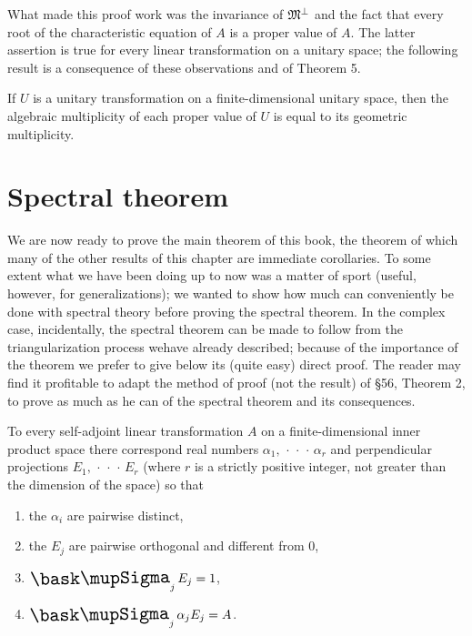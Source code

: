 What made this proof work was the invariance of \(\mathfrak{M}^{\perp}\) and the fact
that every root of the characteristic equation of \(A\) is a proper value of
\(A\). The latter assertion is true for every linear transformation on a unitary
space; the following result is a consequence of these observations and of
Theorem 5.

\begin{theorem}
    If \(U\) is a unitary transformation on a finite-dimensional unitary space, then the algebraic multiplicity of each proper value of \(U\) is equal to its geometric multiplicity.
\end{theorem}

\section{Spectral theorem}

We are now ready to prove the main theorem of this book, the theorem of which
many of the other results of this chapter are immediate corollaries. To some
extent what we have been doing up to now was a matter of sport (useful, however,
for generalizations); we wanted to show how much can conveniently be done with
spectral theory before proving the spectral theorem. In the complex case,
incidentally, the spectral theorem can be made to follow from the
triangularization process wehave already described; because of the importance of
the theorem we prefer to give below its (quite easy) direct proof. The reader
may find it profitable to adapt the method of proof (not the result) of §56,
Theorem 2, to prove as much as he can of the spectral theorem and its
consequences.

\begin{theorem}
    To every self-adjoint linear transformation \(A\) on a finite-dimensional inner product space there correspond real numbers \(\alpha_1,\, \cdot\, \cdot\, \cdot\, \alpha_r\) and perpendicular projections \(E_1,\, \cdot\, \cdot\, \cdot\, E_r\) (where \(r\) is a strictly positive integer, not greater than the dimension of the space) so that
    \begin{enumerate}
       \item the \(\alpha_i\) are pairwise distinct,
       \item the \(E_j\) are pairwise orthogonal and different from \(0\),
       \item \(\sumx_j E_j = 1\),
       \item \(\sumx_j \alpha_j E_j = A\).
    \end{enumerate}
\end{theorem}

